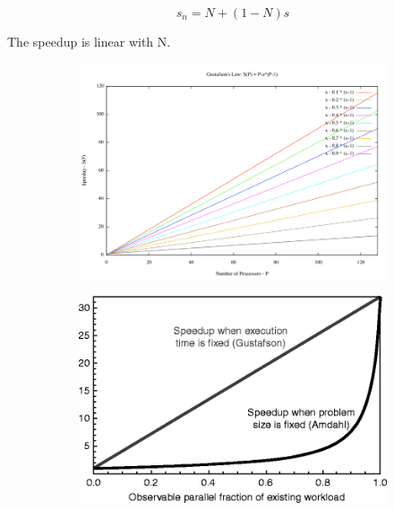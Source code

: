 \begin{equation*}
    s_n = N + (1-N)s
\end{equation*}

The speedup is linear with N.


\begin{figure}[ht]
\centering
\begin{subfigure}{.5\textwidth}
  \centering
  \includegraphics[width=.9\textwidth]{figure_parallel/gustafson1.png}
\end{subfigure}%
\begin{subfigure}{.5\textwidth}
  \centering
  \includegraphics[width=.9\textwidth]{figure_parallel/gustafson2.png}
\end{subfigure}
\end{figure}

\vfill


